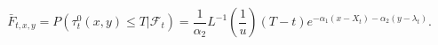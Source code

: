\documentclass[11pt]{article}
\numberwithin{equation}{section}
\begin{document}
$$\bar{F}_{t,x,y} =   P({\tau}_{t}^0(x,y) \leq T \vert \mathcal{F}_t ) =  \frac{1}{\alpha_2} L^{-1}(\frac{1}{u})(T-t)  e^{-\alpha_1 (x-X_t)  -\alpha_2(y-\lambda_t)}.$$
%
%
\\
\end{document}
